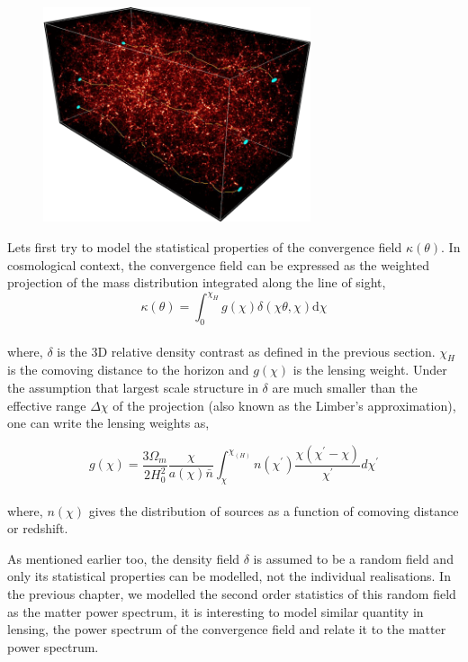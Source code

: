 \begin{figure}
	\centering
	\includegraphics[width=0.7\textwidth]{figures/weaklensing.png}
	\caption{}
	\label{fig:wl}
\end{figure}

Lets first try to model the statistical properties of the convergence field
$\kappa(\theta)$. In cosmological context, the convergence field can be expressed
as the weighted projection of the mass distribution integrated along the line of 
sight,
\begin{equation}
	\kappa(\theta) = \int_0^{\chi_H} g(\chi)\delta(\chi\theta,\chi) \mathrm{d}\chi
\end{equation}
\\
where, $\delta$ is the 3D relative density contrast as defined in the previous section.
$\chi_H$ is the comoving distance to the horizon and $g(\chi)$ is the lensing 
weight. Under the assumption that largest scale structure in $\delta$ are much smaller
than the effective range $\Delta \chi$ of the projection (also known as the Limber's 
approximation), one can write the lensing weights as,

\begin{equation}
	g(\chi) = \dfrac{3\Omega_m}{2H_0^2} \dfrac{\chi}{a(\chi)\bar{n}} \int_{\chi}^{\chi_(H)}
					n(\chi^{\prime}) \dfrac{\chi(\chi^{\prime}-\chi)}{\chi^{\prime}}d\chi^{\prime}
\end{equation}
\\
where, $n(\chi)$ gives the distribution of sources as a function of comoving distance or redshift.

As mentioned earlier too, the density field $\delta$ is assumed to be a random field
and only its statistical properties can be modelled, not the individual realisations. 
In the previous chapter, we modelled the second order statistics of this random field
as the matter power spectrum, it is interesting to model similar quantity in lensing,
the power spectrum of the convergence field and relate it to the matter power spectrum.


